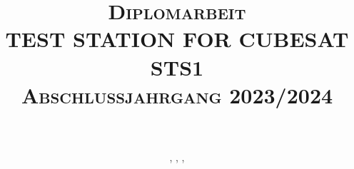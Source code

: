 
\title{\textsc{Diplomarbeit}
		\\ 
		
		\textbf{\uppercase{Test Station for CubeSat STS1}}
		\HRule{2pt} \\ 
		\textsc{Abschlussjahrgang 2023/2024}  \vspace*{5\baselineskip}}

\date{}

\author{
		\school\\
        \klasse\\
         \nameSH, \nameJS, \nameCZ, \nameSB\\ 
		}

